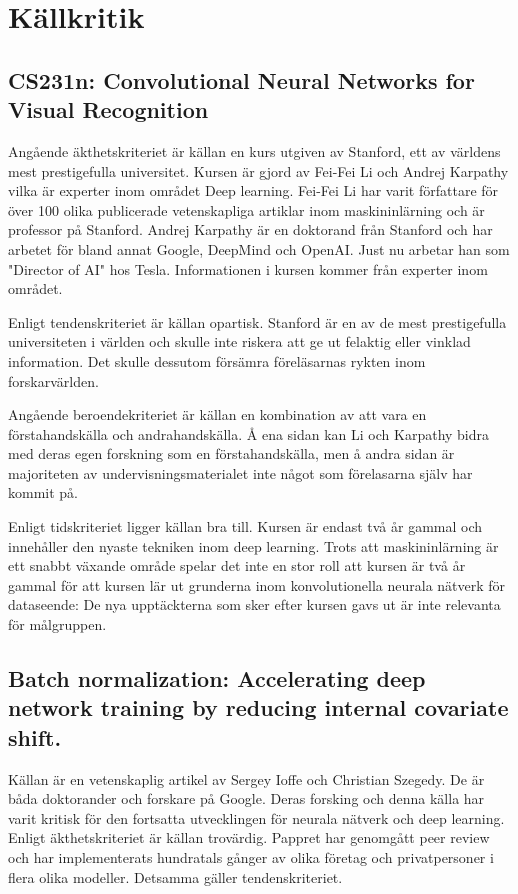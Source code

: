\documentclass[a4paper,11pt,twoside]{article}
\begin{document}
\section{Källkritik}
\subsection{CS231n: Convolutional Neural Networks for Visual Recognition}
Angående äkthetskriteriet är källan en kurs utgiven av Stanford, ett av världens mest prestigefulla universitet. Kursen är gjord av Fei-Fei Li och Andrej Karpathy vilka är experter inom området Deep learning. Fei-Fei Li har varit författare för över 100 olika publicerade vetenskapliga artiklar inom maskininlärning och är professor på Stanford. Andrej Karpathy är en doktorand från Stanford och har arbetet för bland annat Google, DeepMind och OpenAI. Just nu arbetar han som "Director of AI" hos Tesla. Informationen i kursen kommer från experter inom området.

Enligt tendenskriteriet är källan opartisk. Stanford är en av de mest prestigefulla universiteten i världen och skulle inte riskera att ge ut felaktig eller vinklad information. Det skulle dessutom försämra föreläsarnas rykten inom forskarvärlden.

Angående beroendekriteriet är källan en kombination av att vara en förstahandskälla och andrahandskälla. Å ena sidan kan Li och Karpathy bidra med deras egen forskning som en förstahandskälla, men å andra sidan är majoriteten av undervisningsmaterialet inte något som förelasarna själv har kommit på.

Enligt tidskriteriet ligger källan bra till. Kursen är endast två år gammal och innehåller den nyaste tekniken inom deep learning. Trots att maskininlärning är ett snabbt växande område spelar det inte en stor roll att kursen är två år gammal för att kursen lär ut grunderna inom konvolutionella neurala nätverk för dataseende: De nya upptäckterna som sker efter kursen gavs ut är inte relevanta för målgruppen.

\subsection{Batch normalization: Accelerating deep network training by reducing internal covariate shift.}
Källan är en vetenskaplig artikel av Sergey Ioffe och Christian Szegedy. De är båda doktorander och forskare på Google. Deras forsking och denna källa har varit kritisk för den fortsatta utvecklingen för neurala nätverk och deep learning. Enligt äkthetskriteriet är källan trovärdig. Pappret har genomgått peer review och har implementerats hundratals gånger av olika företag och privatpersoner i flera olika modeller. Detsamma gäller tendenskriteriet.
\end{document}
